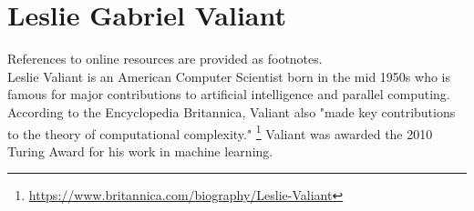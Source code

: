 \documentclass{article}
\begin{document}
\clearpage
\header

\section*{Leslie Gabriel Valiant}

References to online resources are provided as footnotes. \\

Leslie Valiant is an American Computer Scientist born in the mid 1950s who is famous for major contributions to artificial intelligence and parallel computing. According to the Encyclopedia Britannica, Valiant also "made key contributions to the theory of computational complexity."
\footnote{\url{https://www.britannica.com/biography/Leslie-Valiant}}
Valiant was awarded the 2010 Turing Award for his work in machine learning.
\end{document}
